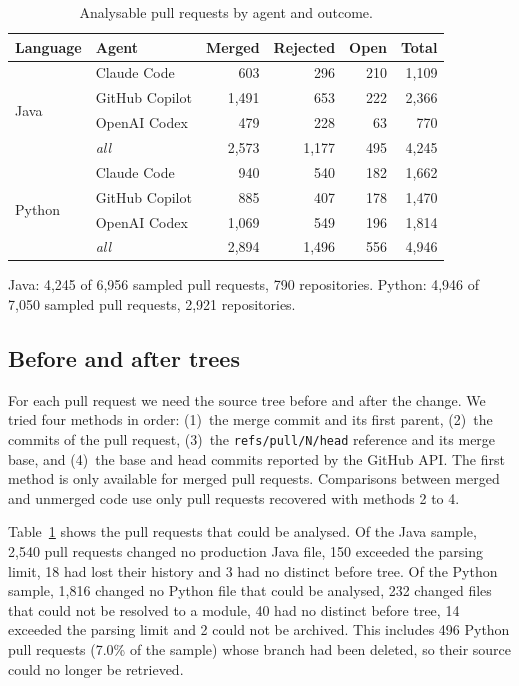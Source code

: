 \documentclass[sigconf]{acmart}
\begin{document}
\begin{table}[t]
\caption{Analysable pull requests by agent and outcome.}
\label{tab:corpus}
\footnotesize
\setlength{\tabcolsep}{4pt}
\begin{tabular}{@{}llrrrr@{}}
\toprule
\textbf{Language} & \textbf{Agent} & \textbf{Merged} & \textbf{Rejected} & \textbf{Open} & \textbf{Total} \\
\midrule
\multirow{4}{*}{Java}
 & Claude Code    &    603 &    296 & 210 & 1,109 \\
 & GitHub Copilot &  1,491 &    653 & 222 & 2,366 \\
 & OpenAI Codex   &    479 &    228 &  63 &   770 \\
 & \textit{all}   &  2,573 &  1,177 & 495 & 4,245 \\
\midrule
\multirow{4}{*}{Python}
 & Claude Code    &    940 &    540 & 182 & 1,662 \\
 & GitHub Copilot &    885 &    407 & 178 & 1,470 \\
 & OpenAI Codex   &  1,069 &    549 & 196 & 1,814 \\
 & \textit{all}   &  2,894 &  1,496 & 556 & 4,946 \\
\bottomrule
\end{tabular}

\vspace{3pt}
\raggedright\scriptsize Java: 4,245 of 6,956 sampled pull requests, 790 repositories. Python: 4,946
of 7,050 sampled pull requests, 2,921 repositories.
\end{table}

\subsection{Before and after trees}
\label{sec:trees}

For each pull request we need the source tree before and after the change. We tried four methods in
order: (1)~the merge commit and its first parent, (2)~the commits of the pull request, (3)~the
\texttt{refs/pull/N/head} reference and its merge base, and (4)~the base and head commits reported by
the GitHub API. The first method is only available for merged pull requests. Comparisons between
merged and unmerged code use only pull requests recovered with methods 2 to 4.

Table~\ref{tab:corpus} shows the pull requests that could be analysed. Of the Java sample, 2,540 pull
requests changed no production Java file, 150 exceeded the parsing limit, 18 had lost their history
and 3 had no distinct before tree. Of the Python sample, 1,816 changed no Python file that could be
analysed, 232 changed files that could not be resolved to a module, 40 had no distinct before tree,
14 exceeded the parsing limit and 2 could not be archived. This includes 496 Python pull requests
(7.0\% of the sample) whose branch had been deleted, so their source could no longer be retrieved.
\end{document}
